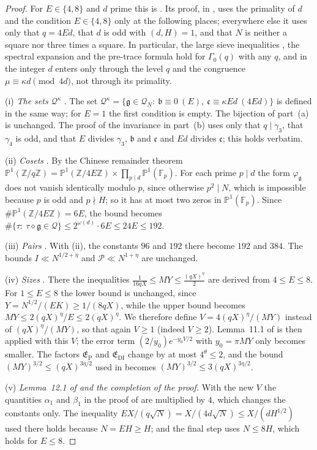 \documentclass[11pt]{amsart}
\theoremstyle{remark}
\theoremstyle{definition}
\numberwithin{equation}{section}
\newcommand{\Z}{\mathbb{Z}}
\newcommand{\Qc}{\mathcal{Q}}
\newcommand{\Pc}{\mathcal{P}}
\newcommand{\fg}{\mathfrak{g}}
\newcommand{\gb}{\mathfrak{b}}
\newcommand{\gc}{\mathfrak{c}}
\begin{document}
\begin{proof}
For $E\in\{4,8\}$ and $d$ prime this is \cite[Theorem~6.1]{IC}. Its proof, in \cite[\S\S8--12]{IC}, uses the primality of $d$ and the condition $E\in\{4,8\}$ only at the following places; everywhere else it uses only that $q=4Ed$, that $d$ is odd with $(d,H)=1$, and that $N$ is neither a square nor three times a square. In particular, the large sieve inequalities \cite[Lemmas~10.2--10.5]{IC}, the spectral expansion and the pre-trace formula hold for $\Gamma_0(q)$ with any $q$, and in \cite[\S\S9,11]{IC} the integer $d$ enters only through the level $q$ and the congruence $\mu\equiv\kappa d\pmod{4d}$, not through its primality.

(i) \emph{The sets $\Qc^\kappa$} \cite[Lemma~8.2]{IC}. The set $\Qc^\kappa=\{\fg\in\Qc_N:\ \gb\equiv0\ (E),\ \gc\equiv\kappa Ed\ (4Ed)\}$ is defined in the same way; for $E=1$ the first condition is empty. The bijection of part~(a) is unchanged. The proof of the invariance in part~(b) uses only that $q\mid\gamma_3$, that $\gamma_4$ is odd, and that $E$ divides $\gamma_3$, $\gb$ and $\gc$ and $Ed$ divides $\gc$; this holds verbatim.

(ii) \emph{Cosets} \cite[Lemma~8.3]{IC}. By the Chinese remainder theorem $\mathbb P^1(\Z/q\Z)=\mathbb P^1(\Z/4E\Z)\times\prod_{p\mid d}\mathbb P^1(\mathbb F_p)$. For each prime $p\mid d$ the form $\varphi_\fg$ does not vanish identically modulo $p$, since otherwise $p^2\mid N$, which is impossible because $p$ is odd and $p\nmid H$; so it has at most two zeros in $\mathbb P^1(\mathbb F_p)$. Since $\#\mathbb P^1(\Z/4E\Z)=6E$, the bound \cite[(8.2)]{IC} becomes $\#\{\tau:\ \tau\diamond\fg\in\Qc\}\le2^{\omega(d)}\cdot6E\le24E\le192$.

(iii) \emph{Pairs} \cite[Lemma~8.4]{IC}. With (ii), the constants $96$ and $192$ there become $192$ and $384$. The bounds $I\ll N^{1/2+\eta}$ and $\Pc\ll N^{1+\eta}$ are unchanged.

(iv) \emph{Sizes} \cite[(12.1)]{IC}. There the inequalities $\frac1{16qX}\le MY\le\frac{(qX)^\eta}2$ are derived from $4\le E\le8$. For $1\le E\le8$ the lower bound is unchanged, since $Y=N^{1/2}/(EK)\ge1/(8qX)$, while the upper bound becomes $MY\le2(qX)^\eta/E\le2(qX)^\eta$. We therefore define $V=4(qX)^\eta/(MY)$ instead of $(qX)^\eta/(MY)$, so that again $V\ge1$ (indeed $V\ge2$). Lemma~11.1 of \cite{IC} is then applied with this $V$; the error term $(2/y_0)e^{-y_0V/2}$ with $y_0=\pi MY$ only becomes smaller. The factors $\mathfrak E_{\mathrm P}$ and $\mathfrak E_{\mathrm{DI}}$ change by at most $4^\theta\le2$, and the bound $(MY)^{3/2}\le(qX)^{3\eta/2}$ used in \cite[\S12.4]{IC} becomes $(MY)^{3/2}\le3(qX)^{3\eta/2}$.

(v) \emph{Lemma~12.1 of \cite{IC} and the completion of the proof.} With the new $V$ the quantities $\alpha_1$ and $\beta_1$ in the proof of \cite[Lemma~12.1]{IC} are multiplied by $4$, which changes the constants only. The inequality $EX/(q\sqrt N)=X/(4d\sqrt N)\le X/(dH^{1/2})$ used there holds because $N=EH\ge H$; and the final step uses $N\le8H$, which holds for $E\le8$.
\end{proof}
\end{document}
